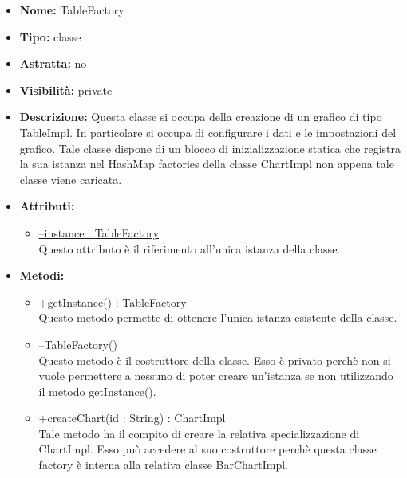 			
			\begin{itemize}
			\item \textbf{Nome:} TableFactory
			\item \textbf{Tipo:} classe
			
		\item \textbf{Astratta:}
		no
			\item \textbf{Visibilità:} private
			\item \textbf{Descrizione:} Questa classe si occupa della creazione di un grafico di tipo TableImpl. In particolare si occupa di configurare i dati e le impostazioni del grafico. Tale classe dispone di un blocco di inizializzazione statica che registra la sua istanza nel HashMap factories della classe ChartImpl non appena tale classe viene caricata.
			\item \textbf{Attributi:}
				\begin{itemize}
				\setlength{\itemsep}{5pt}
				
					\item[\ding{111}] \underline{--instance : TableFactory} \\ [1mm] Questo attributo è il riferimento all'unica istanza della classe.
				\end{itemize}
		
			\item \textbf{Metodi:}
				\begin{itemize}
				\setlength{\itemsep}{5pt}
				
					\item[\ding{111}] {\underline{+getInstance() : TableFactory}} \\ [1mm] Questo metodo permette di ottenere l'unica istanza esistente della classe.
					\item[\ding{111}] {{--TableFactory()}} \\ [1mm] Questo metodo è il costruttore della classe. Esso è privato perchè non si vuole permettere a nessuno di poter creare un’istanza se non utilizzando il metodo getInstance().
					\item[\ding{111}] {{+createChart(id : String) : ChartImpl}} \\ [1mm] Tale metodo ha il compito di creare la relativa specializzazione di ChartImpl. Esso può accedere al suo costruttore perchè questa classe factory è interna alla relativa classe BarChartImpl.
				\end{itemize}
		
			\end{itemize}

